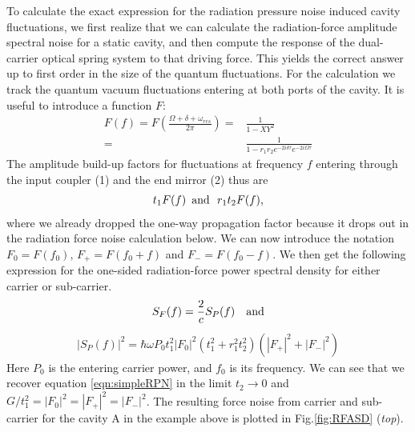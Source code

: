 \documentclass[%
 reprint,
 amsmath,amssymb,
 aps,
]{revtex4-1}
\begin{document}
To calculate the exact expression for the radiation pressure noise induced cavity fluctuations, we first realize that we can calculate the radiation-force amplitude spectral noise for a static cavity, and then compute the response of the dual-carrier optical spring system to that driving force. This yields the correct answer up to first order in the size of the quantum fluctuations. For the calculation we track the quantum vacuum fluctuations entering at both ports of the cavity. It is useful to introduce a function $F$:
\begin{eqnarray}
\label{eqn:RPNfunction}
F(f) = F\left(\frac{\Omega + \delta + \omega_{res}}{2 \pi}\right) =& \frac{1}{1-XY^2}  \\ =& \frac{1}{1-r_1r_2e^{-2 i \delta\tau}e^{-2 i \Omega\tau}}
\end{eqnarray}
The amplitude build-up factors for fluctuations at frequency $f$ entering through the input coupler (1) and the end mirror (2) thus are
\begin{eqnarray}
\label{eqn:RPNfunction12}
 t_1 F(f) \,\,\, {\rm and} \,\,\ r_1 t_2 F(f), 
\end{eqnarray}
where we already dropped the one-way propagation factor because it drops out in the radiation force noise calculation below. 
We can now introduce the notation $F_0=F(f_0)$, $F_+=F(f_0+f)$ and $F_-=F(f_0-f)$. We then get the following expression for the one-sided radiation-force power spectral density for either carrier or sub-carrier.
\begin{eqnarray}
\label{eqn:RPN_P}
S_F (f) = \frac{2}{c} S_P (f) \,\,\,\,\,\, {\rm and}
\end{eqnarray}
\begin{eqnarray}
\label{eqn:RPN}
|S_P (f)|^2 =   \hbar \omega P_0 t_1^2|F_0|^2 (t_1^2 \!\!+\! r_1^2t_2^2)( |F_+|^2 \!\!+\!  |F_-|^2)
\end{eqnarray}
Here $P_0$ is the entering carrier power, and $f_0$ is its frequency. We can see that we recover equation \ref{eqn:simpleRPN} in the limit $t_2 \rightarrow 0$ and $G/t_1^2=|F_0|^2=|F_+|^2=|F_-|^2$. The resulting force noise from carrier and sub-carrier for the cavity A in the example above is plotted in Fig.\ref{fig:RFASD} (\emph{top}).
\end{document}
